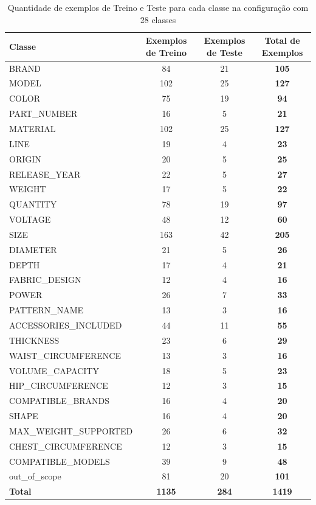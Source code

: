 \begin{table}[H]
\caption{Quantidade de exemplos de Treino e Teste para cada classe na configuração com 28 classes}
\label{table:nova_divisão_de_classes_com_validação}
\tiny %
\begin{tabularx}{\textwidth}{|X|c|c|c|} 
 \hline
 \textbf{Classe} & \textbf{Exemplos de Treino} & \textbf{Exemplos de Teste} & \textbf{Total de Exemplos} \\
 \hline
 BRAND & 84 & 21 & \textbf{105}\\
 \hline
 MODEL & 102 & 25 & \textbf{127}\\
 \hline
 COLOR & 75 & 19 & \textbf{94}\\
 \hline
 PART\_NUMBER & 16 & 5 & \textbf{21}\\
 \hline
 MATERIAL & 102 & 25 & \textbf{127}\\
 \hline
 LINE & 19 & 4 & \textbf{23}\\
 \hline
 ORIGIN & 20 & 5 & \textbf{25}\\
 \hline
 RELEASE\_YEAR & 22 & 5 & \textbf{27}\\
 \hline
 WEIGHT & 17 & 5 & \textbf{22}\\
 \hline
 QUANTITY & 78 & 19 & \textbf{97}\\
 \hline
 VOLTAGE & 48 & 12 & \textbf{60}\\
 \hline
 SIZE & 163 & 42 & \textbf{205}\\
 \hline
 DIAMETER & 21 & 5 & \textbf{26}\\
 \hline
 DEPTH & 17 & 4 & \textbf{21}\\
 \hline
 FABRIC\_DESIGN & 12 & 4 & \textbf{16}\\
 \hline
 POWER & 26 & 7 & \textbf{33}\\
 \hline
 PATTERN\_NAME & 13 & 3 & \textbf{16}\\
 \hline
 ACCESSORIES\_INCLUDED & 44 & 11 & \textbf{55}\\
 \hline
 THICKNESS & 23 & 6 & \textbf{29}\\
 \hline
 WAIST\_CIRCUMFERENCE & 13 & 3 & \textbf{16}\\
 \hline
 VOLUME\_CAPACITY & 18 & 5 & \textbf{23}\\
 \hline
 HIP\_CIRCUMFERENCE & 12 & 3 & \textbf{15}\\
 \hline
 COMPATIBLE\_BRANDS & 16 & 4 & \textbf{20}\\
 \hline
 SHAPE & 16 & 4 & \textbf{20}\\
 \hline
 MAX\_WEIGHT\_SUPPORTED & 26 & 6 & \textbf{32}\\
 \hline
 CHEST\_CIRCUMFERENCE & 12 & 3 & \textbf{15}\\
 \hline
 COMPATIBLE\_MODELS & 39 & 9 & \textbf{48}\\
 \hline
 out\_of\_scope & 81 & 20 & \textbf{101}\\
 \hline
 \textbf{Total} & \textbf{1135} & \textbf{284} & \textbf{1419}\\
 \hline
\end{tabularx}
\end{table}


